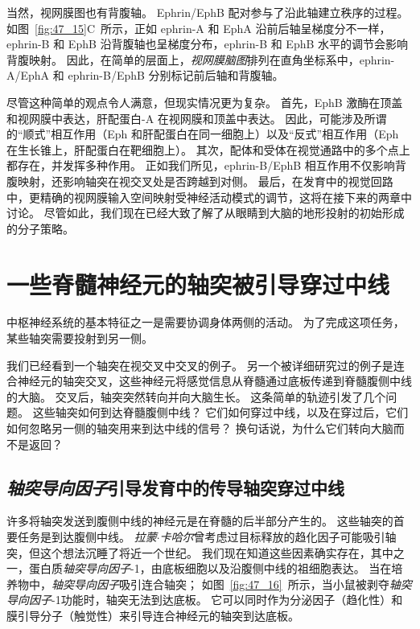 当然，视网膜图也有背腹轴。
Ephrin/EphB 配对参与了沿此轴建立秩序的过程。
如图~\ref{fig:47_15}C~所示，正如 ephrin-A 和 EphA 沿前后轴呈梯度分不一样，ephrin-B 和 EphB 沿背腹轴也呈梯度分布，ephrin-B 和 EphB 水平的调节会影响背腹映射。
因此，在简单的层面上，\textit{视网膜脑图}排列在直角坐标系中，ephrin-A/EphA 和 ephrin-B/EphB 分别标记前后轴和背腹轴。


尽管这种简单的观点令人满意，但现实情况更为复杂。
首先，EphB 激酶在顶盖和视网膜中表达，肝配蛋白-A 在视网膜和顶盖中表达。
因此，可能涉及所谓的“顺式”相互作用（Eph 和肝配蛋白在同一细胞上）以及“反式”相互作用（Eph 在生长锥上，肝配蛋白在靶细胞上）。
其次，配体和受体在视觉通路中的多个点上都存在，并发挥多种作用。
正如我们所见，ephrin-B/EphB 相互作用不仅影响背腹映射，还影响轴突在视交叉处是否跨越到对侧。
最后，在发育中的视觉回路中，更精确的视网膜输入空间映射受神经活动模式的调节，这将在接下来的两章中讨论。
尽管如此，我们现在已经大致了解了从眼睛到大脑的地形投射的初始形成的分子策略。



\section{一些脊髓神经元的轴突被引导穿过中线}

中枢神经系统的基本特征之一是需要协调身体两侧的活动。
为了完成这项任务，某些轴突需要投射到另一侧。


我们已经看到一个轴突在视交叉中交叉的例子。
另一个被详细研究过的例子是连合神经元的轴突交叉，这些神经元将感觉信息从脊髓通过底板传递到脊髓腹侧中线的大脑。
交叉后，轴突突然转向并向大脑生长。
这条简单的轨迹引发了几个问题。
这些轴突如何到达脊髓腹侧中线？
它们如何穿过中线，以及在穿过后，它们如何忽略另一侧的轴突用来到达中线的信号？
换句话说，为什么它们转向大脑而不是返回？



\subsection{\textit{轴突导向因子}引导发育中的传导轴突穿过中线}

许多将轴突发送到腹侧中线的神经元是在脊髓的后半部分产生的。
这些轴突的首要任务是到达腹侧中线。
\textit{拉蒙$\cdot$卡哈尔}曾考虑过目标释放的趋化因子可能吸引轴突，但这个想法沉睡了将近一个世纪。
我们现在知道这些因素确实存在，其中之一，蛋白质\textit{轴突导向因子}-1，由底板细胞以及沿腹侧中线的祖细胞表达。
当在培养物中，\textit{轴突导向因子}吸引连合轴突；
如图~\ref{fig:47_16}~所示，当小鼠被剥夺\textit{轴突导向因子}-1功能时，轴突无法到达底板。
它可以同时作为分泌因子（趋化性）和膜引导分子（触觉性）来引导连合神经元的轴突到达底板。


